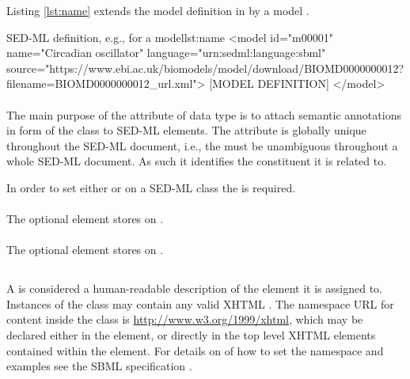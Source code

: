 \begin{blockChanged}
Listing \ref{lst:name} extends the model definition in  by a model .

\begin{myXmlLst}{SED-ML  definition, e.g., for a model}{lst:name}
<model id="m00001" name="Circadian oscillator" language="urn:sedml:language:sbml"
        source="https://www.ebi.ac.uk/biomodels/model/download/BIOMD0000000012?filename=BIOMD0000000012_url.xml">
	[MODEL DEFINITION]
</model>
\end{myXmlLst}
\end{blockChanged}



\paragraph*{}
\label{sec:metaid}
The main purpose of the  attribute of data type  is to attach semantic annotations in form of the \Annotation class to SED-ML elements. The  attribute is globally unique throughout the SED-ML document, i.e., the  must be unambiguous throughout a whole SED-ML document. As such it identifies the constituent it is related to.

In order to set either \Notes or \Annotation on a SED-ML class the  is required.

\paragraph*{}
\label{sec:notesElement}
The optional  element stores \Notes on \SedBase.

\paragraph*{}
\label{sec:annotationElement}
The optional  element stores \Annotation on \SedBase.

\subsection{}
\label{class:notes}
A  is considered a human-readable description of the element it is assigned to. Instances of the  class may contain any valid XHTML \citep{P+02}. The namespace URL for  content inside the \Notes class is \url{http://www.w3.org/1999/xhtml}, which may be declared either in the \SedML element, or directly in the top level XHTML elements contained within the \hyperref[sec:notesElement]{} element. For details on of how to set the namespace and examples see the SBML specification \citep{HBH+10}.


